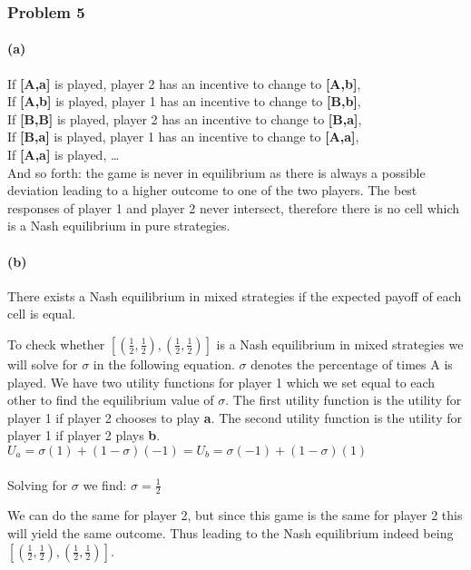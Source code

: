 \documentclass[]{article}
\let\oldparagraph\paragraph
\renewcommand{\paragraph}[1]{\oldparagraph{#1}\mbox{}}
\begin{document}
\subsubsection{Problem 5}\label{problem-5}

\paragraph{(a)}\label{a}

If \textbf{[A,a]} is played, player 2 has an incentive to change to
\textbf{[A,b]},\\
If \textbf{[A,b]} is played, player 1 has an incentive to change to
\textbf{[B,b]},\\
If \textbf{[B,B]} is played, player 2 has an incentive to change to
\textbf{[B,a]},\\
If \textbf{[B,a]} is played, player 1 has an incentive to change to
\textbf{[A,a]},\\
If \textbf{[A,a]} is played, \ldots{}\\
And so forth: the game is never in equilibrium as there is always a
possible deviation leading to a higher outcome to one of the two
players. The best responses of player 1 and player 2 never intersect, therefore there is no cell which is a Nash equilibrium in pure strategies.

\paragraph{(b)}\label{b}

There exists a Nash equilibrium in mixed strategies if the expected
payoff of each cell is equal. 

To check whether $[(\frac{1}{2},\frac{1}{2}),(\frac{1}{2},\frac{1}{2})] $ is a Nash equilibrium in mixed strategies we will solve for $\sigma$ in the following  equation. $\sigma$ denotes the percentage of times A is played. We have two utility functions for player 1 which we set equal to each other to find the equilibrium value of $\sigma$. The first utility function is the utility for player 1 if player 2 chooses to play \textbf{a}. The second utility function is the utility for player 1 if player 2 plays \textbf{b}.  \\

$
U_a=\sigma(1)+(1-\sigma)(-1)=U_b=\sigma(-1)+(1-\sigma)(1) $\\
\\
Solving for $\sigma$ we find:
$\sigma=\frac{1}{2}$

We can do the same for player 2, but since this game is the same for player 2 this will yield the same outcome. Thus leading to the Nash equilibrium indeed being $[(\frac{1}{2},\frac{1}{2}),(\frac{1}{2},\frac{1}{2})] $.
\end{document}
